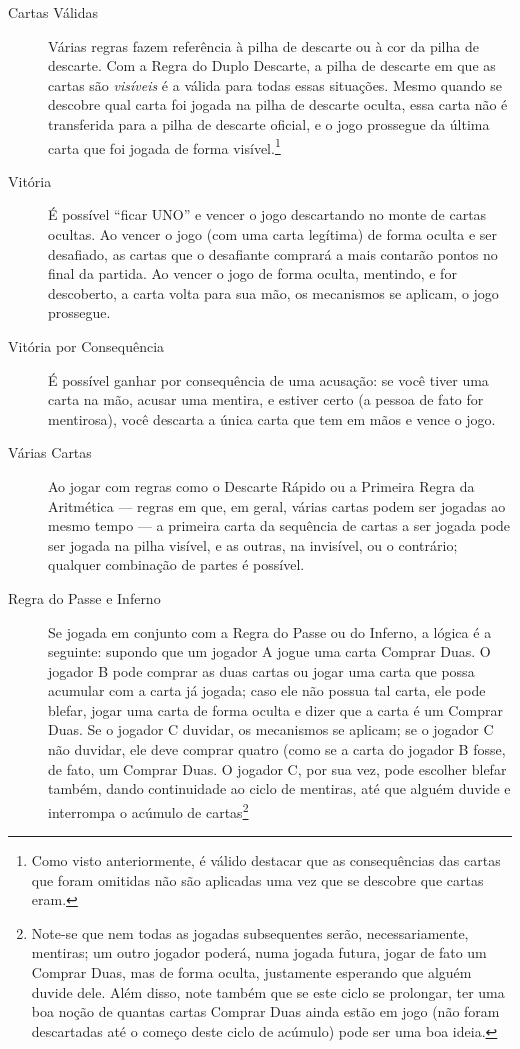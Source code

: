 \begin{description}
\item[Cartas Válidas]{Várias regras fazem referência à pilha de descarte ou à cor da pilha de descarte. Com a Regra do Duplo Descarte, a pilha de descarte em que as cartas são \emph{visíveis} é a válida para todas essas situações. Mesmo quando se descobre qual carta foi jogada na pilha de descarte oculta, essa carta não é transferida para a pilha de descarte oficial, e o jogo prossegue da última carta que foi jogada de forma visível.\footnote{Como visto anteriormente, é válido destacar que as consequências das cartas que foram omitidas não são aplicadas uma vez que se descobre que cartas eram.}}
\item[Vitória]{É possível ``ficar UNO'' e vencer o jogo descartando no monte de cartas ocultas. Ao vencer o jogo (com uma carta legítima) de forma oculta e ser desafiado, as cartas que o desafiante comprará a mais contarão pontos no final da partida. Ao vencer o jogo de forma oculta, mentindo, e for descoberto, a carta volta para sua mão, os mecanismos se aplicam, o jogo prossegue.}
\item[Vitória por Consequência]{É possível ganhar por consequência de uma acusação: se você tiver uma carta na mão, acusar uma mentira, e estiver certo (a pessoa de fato for mentirosa), você descarta a única carta que tem em mãos e vence o jogo.}
\item[Várias Cartas]{Ao jogar com regras como o Descarte Rápido ou a Primeira Regra da Aritmética --- regras em que, em geral, várias cartas podem ser jogadas ao mesmo tempo --- a primeira carta da sequência de cartas a ser jogada pode ser jogada na pilha visível, e as outras, na invisível, ou o contrário; qualquer combinação de partes é possível.}
\item[Regra do Passe e Inferno]{Se jogada em conjunto com a Regra do Passe ou do Inferno, a lógica é a seguinte: supondo que um jogador A jogue uma carta Comprar Duas. O jogador B pode comprar as duas cartas ou jogar uma carta que possa acumular com a carta já jogada; caso ele não possua tal carta, ele pode blefar, jogar uma carta de forma oculta e dizer que a carta é um Comprar Duas. Se o jogador C duvidar, os mecanismos se aplicam; se o jogador C não duvidar, ele deve comprar quatro (como se a carta do jogador B fosse, de fato, um Comprar Duas. O jogador C, por sua vez, pode escolher blefar também, dando continuidade ao ciclo de mentiras, até que alguém duvide e interrompa o acúmulo de cartas\footnote{Note-se que nem todas as jogadas subsequentes serão, necessariamente, mentiras; um outro jogador poderá, numa jogada futura, jogar de fato um Comprar Duas, mas de forma oculta, justamente esperando que alguém duvide dele. Além disso, note também que se este ciclo se prolongar, ter uma boa noção de quantas cartas Comprar Duas ainda estão em jogo (não foram descartadas até o começo deste ciclo de acúmulo) pode ser uma boa ideia.}}
\end{description}

